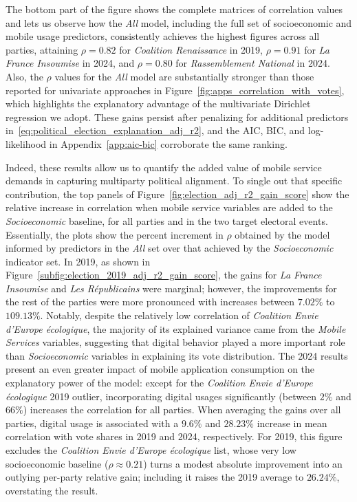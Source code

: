 \documentclass[9pt,sigconf,letterpaper]{acmart}
\newcommand{\RN}{\textsl{Rassemblement National}\xspace}
\newcommand{\LR}{\textsl{Les Républicains}\xspace}
\newcommand{\RENA}{\textsl{Coalition Renaissance}\xspace}
\newcommand{\LFI}{\textsl{La France Insoumise}\xspace}
\newcommand{\ENVI}{\textsl{Coalition Envie d'Europe écologique}\xspace}
\newcommand{\socioeconomic}{\emph{Socioeconomic}\xspace}
\newcommand{\mobile}{\emph{Mobile Services}\xspace}
\newcommand{\all}{\emph{All}\xspace}
\begin{document}
The bottom part of the figure shows the complete matrices of correlation values and lets us observe how the \all model, including the full set of socioeconomic and mobile usage predictors, consistently achieves the highest figures across all parties, attaining $\rho=0.82$ for \RENA in 2019, $\rho=0.91$ for \LFI in 2024, and $\rho=0.80$ for \RN in 2024. Also, the $\rho$ values for the \all model are substantially stronger than those reported for univariate approaches in Figure~\ref{fig:apps_correlation_with_votes}, which highlights the explanatory advantage of the multivariate Dirichlet regression we adopt.
These gains persist after penalizing for additional predictors in~\eqref{eq:political_election_explanation_adj_r2}, and the \ac{AIC}, \ac{BIC}, and log-likelihood in Appendix~\ref{app:aic-bic} corroborate the same ranking.

Indeed, these results allow us to quantify the added value of mobile service demands in capturing multiparty political alignment. To single out that specific contribution, the top panels of Figure~\ref{fig:election_adj_r2_gain_score} show the relative increase in correlation when mobile service variables are added to the \socioeconomic baseline, for all parties and in the two target electoral events.
Essentially, the plots show the percent increment in $\rho$ obtained by the model informed by predictors in the \all set over that achieved by the \socioeconomic indicator set.
In 2019, as shown in Figure~\ref{subfig:election_2019_adj_r2_gain_score}, the gains for \LFI and \LR were marginal; however, the improvements for the rest of the parties were more pronounced with 
increases between $7.02\%$ to $109.13\%$.
Notably, despite the relatively low correlation of \ENVI, the majority of its explained variance came from the \mobile variables, suggesting that digital behavior played a more important role than \socioeconomic variables in explaining its vote distribution.
The 2024 results present an even greater impact of mobile application consumption on the explanatory power of the model: except for the \ENVI 2019 outlier, incorporating digital usages significantly (between $2\%$ and $66\%$) increases the correlation for all parties.
When averaging the gains over all parties, digital usage is associated with a $9.6\%$ and $28.23\%$ increase in mean correlation with vote shares in 2019 and 2024, respectively. For 2019, this figure excludes the \ENVI list, whose very low socioeconomic baseline ($\rho \approx 0.21$) turns a modest absolute improvement into an outlying per-party relative gain; including it raises the 2019 average to $26.24\%$, overstating the result.
\end{document}
